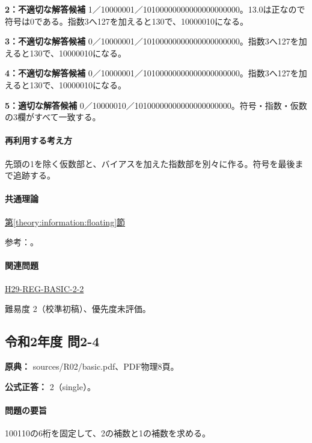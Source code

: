 \noindent\textbf{2：不適切な解答候補} 1／10000001／10100000000000000000000。13.0は正なので符号は0である。指数3へ127を加えると130で、10000010になる。\par

\noindent\textbf{3：不適切な解答候補} 0／10000001／10100000000000000000000。指数3へ127を加えると130で、10000010になる。\par

\noindent\textbf{4：不適切な解答候補} 0／10000001／10100000000000000000000。指数3へ127を加えると130で、10000010になる。\par

\noindent\textbf{5：適切な解答候補} 0／10000010／10100000000000000000000。符号・指数・仮数の3欄がすべて一致する。\par

\paragraph{再利用する考え方} 先頭の1を除く仮数部と、バイアスを加えた指数部を別々に作る。符号を最後まで追跡する。

\paragraph{共通理論} \hyperref[theory:information:floating]{第\ref*{theory:information:floating}節}

\par 参考：\cite{oracle_single}。

\paragraph{関連問題} \hyperref[q:h29-reg-basic-2-2]{H29-REG-BASIC-2-2}

\par 難易度 2（校準初稿）、優先度未評価。

\subsection{令和2年度 問2-4}
\label{q:r02-reg-basic-2-4}

\noindent\textbf{原典：} sources/R02/basic.pdf、PDF物理8頁。

\textbf{公式正答：} 2（single）。

\paragraph{問題の要旨} 100110の6桁を固定して、2の補数と1の補数を求める。

